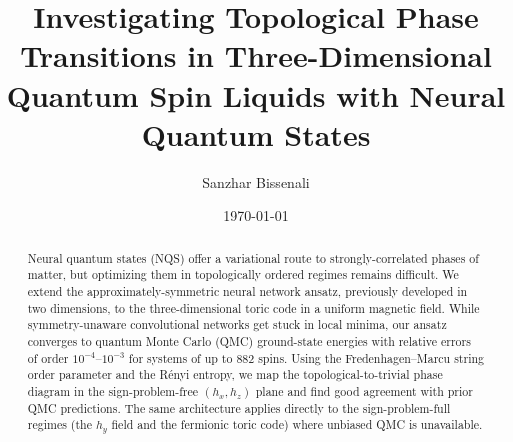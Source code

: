 \documentclass[
  aps,            %
  prl,            %
  reprint,        %
  groupedaddress, %
  amsmath,amssymb,
  floatfix,       %
  nofootinbib,    %
  longbibliography %
]{revtex4-2}
\newcommand{\todo}[1]{\textcolor{red}{\textbf{[TODO: #1]}}}
\begin{document}
\title{Investigating Topological Phase Transitions in Three-Dimensional Quantum Spin Liquids with Neural Quantum States}

\author{Sanzhar Bissenali}


\date{\today}

\begin{abstract}
Neural quantum states (NQS) offer a variational route to strongly-correlated phases of matter, but optimizing them in topologically ordered regimes remains difficult. We extend the approximately-symmetric neural network ansatz, previously developed in two dimensions, to the three-dimensional toric code in a uniform magnetic field.  While symmetry-unaware convolutional networks get stuck in local minima, our ansatz converges to quantum Monte Carlo (QMC) ground-state energies with relative errors of order $10^{-4}$--$10^{-3}$ for systems of up to 882 spins. Using the Fredenhagen--Marcu string order parameter and the R\'enyi entropy, we map the topological-to-trivial phase diagram in the sign-problem-free $(h_x,h_z)$ plane and find good agreement with prior QMC predictions. The same architecture applies directly to the sign-problem-full regimes (the $h_y$ field and the fermionic toric code) where unbiased QMC is unavailable.
\end{abstract}

\maketitle

\end{document}

